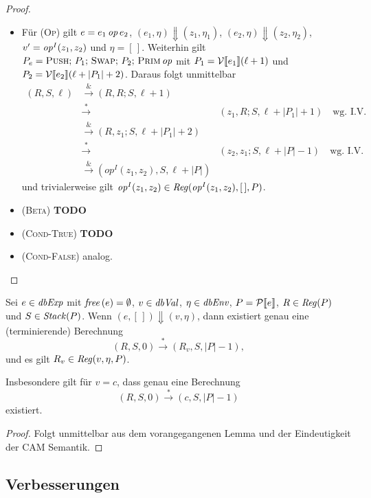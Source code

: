 \documentclass[12pt,fleqn,a4paper]{article}
\newcommand{\RN}[1]{\mbox{\textsc{(#1)}}}
\begin{document}
\begin{proof}
\begin{itemize}
  \item F\"ur \RN{Op} gilt $e = e_1\,{\text{\it op\/}}\,e_2$, $(e_1,\eta) \Downarrow (z_1,\eta_1)$,
    $(e_2,\eta) \Downarrow (z_2,\eta_2)$,
    $v' = {\text{\it op\/}}^I(z_1,z_2)$ und $\eta = [\,]$. Weiterhin gilt
    $P_e = \textsc{Push};\,P_1;\,\textsc{Swap};\,P_2;\,\textsc{Prim}\,{\text{\it op\/}}$ mit
    $P_1=\mathcal{V}\llbracket e_1 \rrbracket(\ell+1)$ und $P_2=\mathcal{V}\llbracket e_2 \rrbracket(\ell+|P_1|+2)$. Daraus folgt unmittelbar
    \[\begin{array}{rcl}
      (R,S,\ell)
      &\xrightarrow& (R,R;S,\ell+1) \\
      &\xrightarrow*& (z_1,R;S,\ell+|P_1|+1) \quad \text{wg. I.V.} \\
      &\xrightarrow& (R,z_1;S,\ell+|P_1|+2) \\
      &\xrightarrow*& (z_2,z_1;S,\ell+|P|-1) \quad \text{wg. I.V.} \\
      &\xrightarrow& (op^I(z_1,z_2),S,\ell+|P|)
    \end{array}\]
    und trivialerweise gilt ${\text{\it op\/}}^I(z_1,z_2) \in {\text{\it Reg\/}}({\text{\it op\/}}^I(z_1,z_2),[\,],P)$.

  \item \RN{Beta} {\bf TODO}

  \item \RN{Cond-True} {\bf TODO}
    
  \item \RN{Cond-False} analog.
  \end{itemize}
\end{proof}

\begin{theorem}
  Sei $e\in{\text{\it dbExp\/}}$ mit ${\text{\it free\/}}\,(e)=\emptyset$, $v\in{\text{\it dbVal\/}}$, $\eta\in{\text{\it dbEnv\/}}$, $P=\mathcal{P}\llbracket e \rrbracket$, $R\in{\text{\it Reg\/}}(P)$
  und $S\in{\text{\it Stack\/}}(P)$. Wenn $(e,[\,])\Downarrow(v,\eta)$, dann existiert genau eine (terminierende) Berechnung
  \[(R,S,0) \xrightarrow* (R_v,S,|P|-1),\]
  und es gilt $R_v\in{\text{\it Reg\/}}(v,\eta,P)$.
\end{theorem}

Insbesondere gilt f\"ur $v=c$, dass genau eine Berechnung \[(R,S,0) \xrightarrow* (c,S,|P|-1)\] existiert.

\begin{proof}
  Folgt unmittelbar aus dem vorangegangenen Lemma und der Eindeutigkeit der CAM Semantik.
\end{proof}


\subsection{Verbesserungen}
\end{document}
